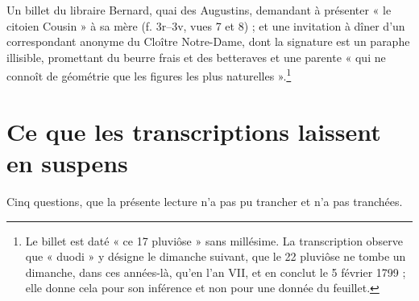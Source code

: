 \documentclass[11pt,a4paper]{article}
\begin{document}
Un billet du libraire Bernard, quai des Augustins, demandant à présenter « le
citoien Cousin » à sa mère (f. 3r–3v, vues 7 et 8) ; et une invitation à dîner
d'un correspondant anonyme du Cloître Notre-Dame, dont la signature est un
paraphe illisible, promettant du beurre
frais et des betteraves et une parente « qui ne connoît de géométrie que les
figures les plus naturelles ».\footnote{Le billet est daté « ce 17 pluviôse »
sans millésime. La transcription observe que « duodi » y désigne le dimanche
suivant, que le 22 pluviôse ne tombe un dimanche, dans ces années-là, qu'en
l'an VII, et en conclut le 5 février 1799 ; elle donne cela pour son
inférence et non pour une donnée du feuillet.}

\section*{Ce que les transcriptions laissent en suspens}

Cinq questions, que la présente lecture n'a pas pu trancher et n'a pas
tranchées.
\end{document}
